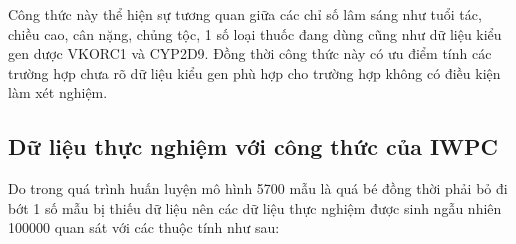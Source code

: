 \documentclass[14pt,oneside]{scrbook}
\begin{document}
Công thức này thể hiện sự tương quan giữa các chỉ số lâm sáng như tuổi
tác, chiều cao, cân nặng, chủng tộc, 1 số loại thuốc đang dùng cũng như
dữ liệu kiểu gen dược VKORC1 và CYP2D9. Đồng thời công thức này có ưu
điểm tính các trường hợp chưa rõ dữ liệu kiểu gen phù hợp cho trường hợp
không có điều kiện làm xét nghiệm.

\subsection{Dữ liệu thực nghiệm với công thức của
IWPC}\label{dux1eef-liux1ec7u-thux1ef1c-nghiux1ec7m-vux1edbi-cuxf4ng-thux1ee9c-cux1ee7a-iwpc}

Do trong quá trình huấn luyện mô hình 5700 mẫu là quá bé đồng thời phải
bỏ đi bớt 1 số mẫu bị thiếu dữ liệu nên các dữ liệu thực nghiệm được
sinh ngẫu nhiên 100000 quan sát với các thuộc tính như sau:
\end{document}
